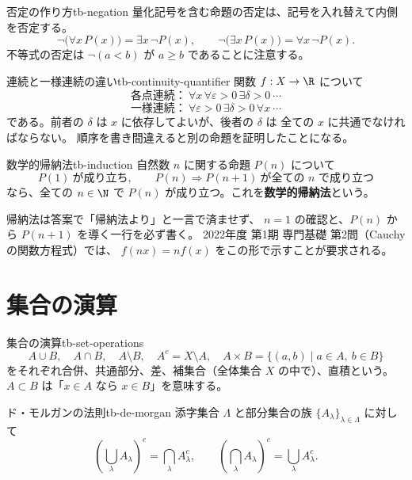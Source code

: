 \begin{definition}{否定の作り方}{tb-negation}
量化記号を含む命題の否定は、記号を入れ替えて内側を否定する。
\[
\lnot\bigl(\forall x\,P(x)\bigr)=\exists x\,\lnot P(x),
\qquad
\lnot\bigl(\exists x\,P(x)\bigr)=\forall x\,\lnot P(x).
\]
不等式の否定は $\lnot(a<b)$ が $a\ge b$ であることに注意する。
\end{definition}

\begin{example}{連続と一様連続の違い}{tb-continuity-quantifier}
関数 $f:X\to\R$ について
\[
\text{各点連続：}\ \forall x\,\forall\varepsilon>0\,\exists\delta>0\ \cdots
\]
\[
\text{一様連続：}\ \forall\varepsilon>0\,\exists\delta>0\,\forall x\ \cdots
\]
である。前者の $\delta$ は $x$ に依存してよいが、後者の $\delta$ は
全ての $x$ に共通でなければならない。
順序を書き間違えると別の命題を証明したことになる。
\end{example}

\begin{definition}{数学的帰納法}{tb-induction}
自然数 $n$ に関する命題 $P(n)$ について
\[
P(1)\ \text{が成り立ち},\qquad
P(n)\Longrightarrow P(n+1)\ \text{が全ての $n$ で成り立つ}
\]
なら、全ての $n\in\N$ で $P(n)$ が成り立つ。これを\textbf{数学的帰納法}という。
\end{definition}

\begin{memo*}
帰納法は答案で「帰納法より」と一言で済ませず、
$n=1$ の確認と、$P(n)$ から $P(n+1)$ を導く一行を必ず書く。
2022年度 第1期 専門基礎 第2問（Cauchy の関数方程式）では、
$f(nx)=nf(x)$ をこの形で示すことが要求される。
\end{memo*}

\section{集合の演算}

\begin{definition}{集合の演算}{tb-set-operations}
\[
A\cup B,\quad A\cap B,\quad A\setminus B,\quad A^{c}=X\setminus A,\quad
A\times B=\{(a,b)\mid a\in A,\ b\in B\}
\]
をそれぞれ合併、共通部分、差、補集合（全体集合 $X$ の中で）、直積という。
$A\subset B$ は「$x\in A$ なら $x\in B$」を意味する。
\end{definition}

\begin{proposition}{ド・モルガンの法則}{tb-de-morgan}
添字集合 $\Lambda$ と部分集合の族 $\{A_\lambda\}_{\lambda\in\Lambda}$ に対して
\[
\left(\bigcup_{\lambda}A_\lambda\right)^{c}=\bigcap_{\lambda}A_\lambda^{c},
\qquad
\left(\bigcap_{\lambda}A_\lambda\right)^{c}=\bigcup_{\lambda}A_\lambda^{c}.
\]
\end{proposition}

